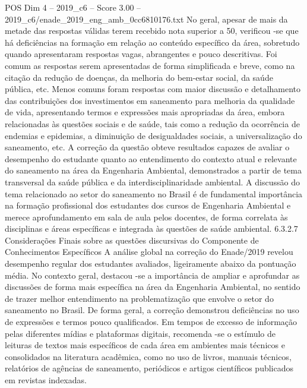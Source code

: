 \begin{textsample}{POS Dim 4 – 2019\_c6 – Score 3.00 – 2019\_c6/enade\_2019\_eng\_amb\_0cc6810176.txt}
No geral, apesar de mais da metade das respostas válidas terem recebido nota superior a 50, verificou -se que há deficiências na formação em relação ao conteúdo específico da área, sobretudo quando apresentaram respostas vagas, abrangentes e pouco descritivas.
Foi comum as respostas serem apresentadas de forma simplificada e breve, como na citação da redução de doenças, da melhoria do bem-estar social, da saúde pública, etc.
Menos comuns foram respostas com maior discussão e detalhamento das contribuições dos investimentos em saneamento para melhoria da qualidade de vida, apresentando termos e expressões mais apropriadas da área, embora relacionadas às questões sociais e de saúde, tais como a redução da ocorrência de endemias e epidemias, a diminuição de desigualdades sociais, a universalização do saneamento, etc.
A correção da questão obteve resultados capazes de avaliar o desempenho do estudante quanto ao entendimento do contexto atual e relevante do saneamento na área da Engenharia Ambiental, demonstrados a partir de tema transversal da saúde pública e da interdisciplinaridade ambiental.
A discussão do tema relacionado ao setor do saneamento no Brasil é de fundamental importância na formação profissional dos estudantes dos cursos de Engenharia Ambiental e merece aprofundamento em sala de aula pelos docentes, de forma correlata às disciplinas e áreas específicas e integrada às questões de saúde ambiental. 6.3.2.7 Considerações Finais sobre as questões discursivas do Componente de Conhecimentos Específicos A análise global na correção do Enade/2019 revelou desempenho regular dos estudantes avaliados, ligeiramente abaixo da pontuação média.
No contexto geral, destacou -se a importância de ampliar e aprofundar as discussões de forma mais específica na área da Engenharia Ambiental, no sentido de trazer melhor entendimento na problematização que envolve o setor do saneamento no Brasil.
De forma geral, a correção demonstrou deficiências no uso de expressões e termos pouco qualificados.
Em tempos de excesso de informação pelas diferentes mídias e plataformas digitais, recomenda -se o estímulo de leituras de textos mais específicos de cada área em ambientes mais técnicos e consolidados na literatura acadêmica, como no uso de livros, manuais técnicos, relatórios de agências de saneamento, periódicos e artigos científicos publicados em revistas indexadas.

\end{textsample}
